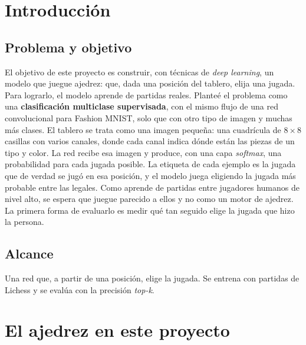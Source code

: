\documentclass[a4paper,12pt,twocolumn]{article}
\begin{document}
\onecolumn
{}
\thispagestyle{plain}
\setcounter{tocdepth}{2}
\tableofcontents
\twocolumn
{}

\section{Introducción}

\subsection{Problema y objetivo}

El objetivo de este proyecto es construir, con técnicas de \textit{deep learning}, un modelo que juegue ajedrez: que, dada una posición del tablero, elija una jugada.
\newline
Para lograrlo, el modelo aprende de partidas reales. Planteé el problema como una \textbf{clasificación multiclase supervisada}, con el mismo flujo de una red convolucional para Fashion MNIST, solo que con otro tipo de imagen y muchas más clases. El tablero se trata como una imagen pequeña: una cuadrícula de $8\times8$ casillas con varios canales, donde cada canal indica dónde están las piezas de un tipo y color. La red recibe esa imagen y produce, con una capa \textit{softmax}, una probabilidad para cada jugada posible. La etiqueta de cada ejemplo es la jugada que de verdad se jugó en esa posición, y el modelo juega eligiendo la jugada más probable entre las legales.
\newline
Como aprende de partidas entre jugadores humanos de nivel alto, se espera que juegue parecido a ellos y no como un motor de ajedrez. La primera forma de evaluarlo es medir qué tan seguido elige la jugada que hizo la persona.

\subsection{Alcance}

Una red que, a partir de una posición, elige la jugada. Se entrena con partidas de Lichess y se evalúa con la precisión \textit{top-k}.

\section{El ajedrez en este proyecto}
\end{document}
